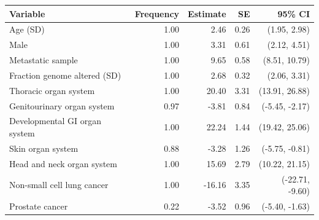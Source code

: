 \begin{tabular}{lrrrr}
\toprule
Variable & Frequency & Estimate & SE & 95\% CI\\
\midrule
Age (SD) & 1.00 & 2.46 & 0.26 & (1.95, 2.98)\\
Male & 1.00 & 3.31 & 0.61 & (2.12, 4.51)\\
Metastatic sample & 1.00 & 9.65 & 0.58 & (8.51, 10.79)\\
Fraction genome altered (SD) & 1.00 & 2.68 & 0.32 & (2.06, 3.31)\\
Thoracic organ system & 1.00 & 20.40 & 3.31 & (13.91, 26.88)\\
Genitourinary organ system & 0.97 & -3.81 & 0.84 & (-5.45, -2.17)\\
Developmental GI organ system & 1.00 & 22.24 & 1.44 & (19.42, 25.06)\\
Skin organ system & 0.88 & -3.28 & 1.26 & (-5.75, -0.81)\\
Head and neck organ system & 1.00 & 15.69 & 2.79 & (10.22, 21.15)\\
Non-small cell lung cancer & 1.00 & -16.16 & 3.35 & (-22.71, -9.60)\\
Prostate cancer & 0.22 & -3.52 & 0.96 & (-5.40, -1.63)\\
\bottomrule
\end{tabular}
